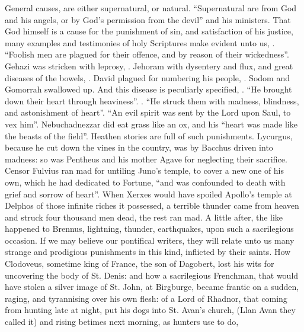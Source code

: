 General causes, are either supernatural, or natural. \enquote{Supernatural are from God
and his angels, or by God's permission from the devil} and his ministers. That
God himself is a cause for the punishment of sin, and satisfaction of his
justice, many examples and testimonies of holy Scriptures make evident unto us,
. \enquote{Foolish men are plagued for their offence, and by
reason of their wickedness}. Gehazi was stricken with leprosy, . Jehoram with dysentery and flux, and great diseases of the bowels,
. David plagued for numbering his people,
. Sodom and Gomorrah swallowed up. And this disease is
peculiarly specified, . \enquote{He brought down their
heart through heaviness}. . \enquote{He struck them with
madness, blindness, and astonishment of heart}. \enquote{An evil
spirit was sent by the Lord upon Saul, to vex him}.
Nebuchadnezzar did eat grass like an ox, and his \enquote{heart
was made like the beasts of the field}. Heathen stories are full of such
punishments. Lycurgus, because he cut down the vines in the country, was by
Bacchus driven into madness: so was Pentheus and his mother Agave for
neglecting their sacrifice. Censor Fulvius ran mad for
untiling Juno's temple, to cover a new one of his own, which he had dedicated
to Fortune, \enquote{and was confounded to death with grief and
sorrow of heart}. When Xerxes would have spoiled Apollo's
temple at Delphos of those infinite riches it possessed, a terrible thunder
came from heaven and struck four thousand men dead, the rest ran mad.
A little after, the like happened to Brennus, lightning,
thunder, earthquakes, upon such a sacrilegious occasion. If we may believe our
pontifical writers, they will relate unto us many strange and prodigious
punishments in this kind, inflicted by their saints. How
Clodoveus, sometime king of France, the son of Dagobert,
lost his wits for uncovering the body of St. Denis: and how a
sacrilegious Frenchman, that would have stolen a silver
image of St. John, at Birgburge, became frantic on a sudden, raging, and
tyrannising over his own flesh: of a Lord of Rhadnor, that
coming from hunting late at night, put his dogs into St. Avan's church, (Llan
Avan they called it) and rising betimes next morning, as hunters use to do,
